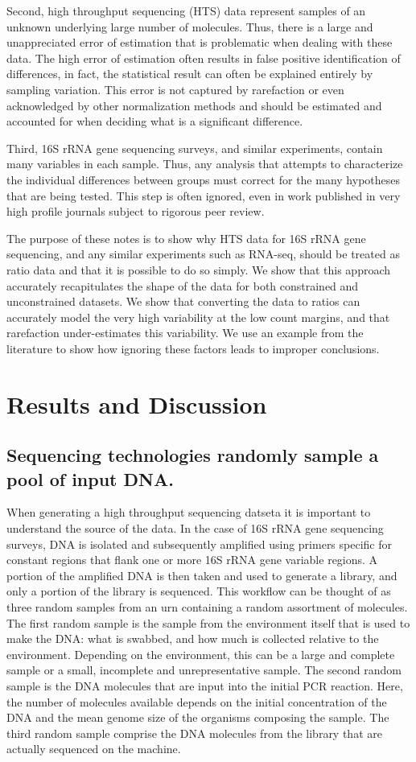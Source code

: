 \documentclass[11pt]{article}\usepackage[]{graphicx}\usepackage[]{color}
\begin{document}
Second, high throughput sequencing (HTS) data represent samples of an unknown underlying large number of molecules. Thus, there is a large and unappreciated  error of estimation that is problematic when dealing with these data\cite{fernandes:2013}. The high error of estimation often results in false positive identification of differences, in fact, the statistical result can often be explained entirely by sampling variation.  This error is not captured by rarefaction or even acknowledged by other normalization methods and should be estimated and accounted for when deciding what is a significant difference. 

Third, 16S rRNA gene sequencing surveys, and similar experiments, contain many variables in each sample. Thus, any analysis that attempts to characterize the individual differences between groups must correct for the many hypotheses that are being tested. This step is often ignored, even in work published in very high profile journals subject to rigorous peer review. 

The purpose of these notes is to show  why HTS data for 16S rRNA gene sequencing, and any similar experiments such as RNA-seq, should be treated as ratio data and that it is possible to do so simply. We show that this approach accurately recapitulates the shape of the data for both constrained and unconstrained datasets. We show that converting the data to ratios can accurately model the very high variability at the low count margins, and that rarefaction under-estimates this variability. We use an example from the literature to show how ignoring these factors leads to improper conclusions.

\section{Results and Discussion}
\subsection{Sequencing technologies  randomly sample a pool of input DNA.} 

When generating a high throughput sequencing datseta it is important to understand the source of the data. In the case of 16S rRNA gene sequencing surveys, DNA is isolated and subsequently amplified using primers specific for constant regions that flank one or more 16S rRNA gene variable regions. A portion of the amplified DNA is then taken and used to generate a library, and only a portion of the library is sequenced. This workflow can be thought of as three random samples from an urn containing a random assortment of molecules. The first random sample is the sample from the environment itself that is used to make the DNA: what is swabbed, and how much is collected relative to the environment. Depending on the environment, this can be a large and complete sample or a small, incomplete and unrepresentative sample. The second random sample is the DNA molecules that are input into the initial PCR reaction. Here, the number of molecules available depends on the initial concentration of the DNA and the mean genome size of the organisms composing the sample. The third random sample comprise the DNA molecules from the library that are actually sequenced on the machine. 
\end{document}
